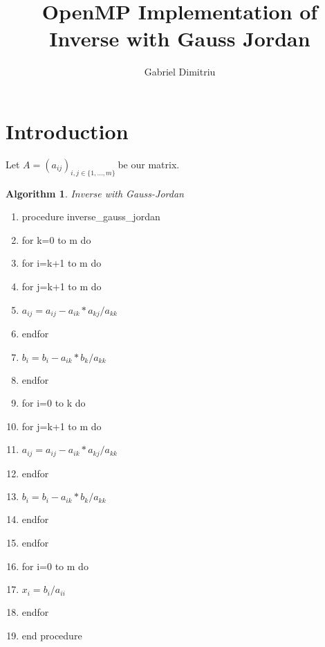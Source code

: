 \documentclass[a4paper]{article}
\newtheorem{algorithm}[theorem]{Algorithm}
\begin{document}
\title{OpenMP Implementation of Inverse with Gauss Jordan}
\date{}
\author{Gabriel Dimitriu}
\maketitle

\section{Introduction}

Let  $A=(a_{ij})_{i,j\in \{1,...,m\}}\ $be our matrix.

\begin{algorithm}
Inverse with Gauss-Jordan
\end{algorithm}

\begin{enumerate}
\item procedure inverse\_gauss\_jordan

\item for k=0 to m do

\item \qquad for i=k+1 to m do

\item \qquad \qquad for j=k+1 to m do

\item \qquad \qquad \qquad $a_{ij}=a_{ij}-a_{ik}\ast a_{kj}/a_{kk}$

\item \qquad \qquad endfor

\item \qquad \qquad $b_{i}=b_{i}-a_{ik}\ast b_{k}/a_{kk}$

\item \qquad endfor

\item \qquad for i=0 to k do

\item \qquad \qquad for j=k+1 to m do

\item \qquad \qquad \qquad $a_{ij}=a_{ij}-a_{ik}\ast a_{kj}/a_{kk}$

\item \qquad \qquad endfor

\item \qquad \qquad $b_{i}=b_{i}-a_{ik}\ast b_{k}/a_{kk}$

\item \qquad endfor

\item endfor

\item for i=0 to m do

\item \qquad $x_{i}=b_{i}/a_{ii}$

\item endfor

\item end procedure
\end{enumerate}
\end{document}
